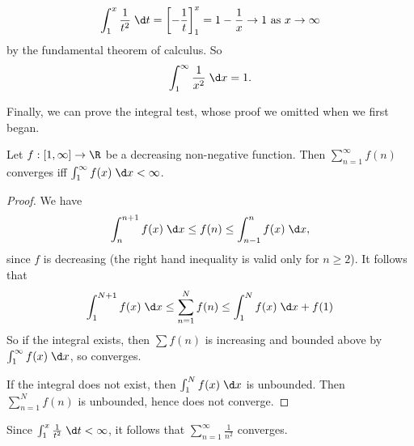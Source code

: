 \documentclass[a4paper]{article}
\begin{document}
\begin{eg}
  \[
    \int_1^x \frac{1}{t^2}\;\d t = \left[-\frac{1}{t}\right]_1^x = 1 - \frac{1}{x} \to 1\text{ as }x\to \infty
  \]
  by the fundamental theorem of calculus. So
  \[
    \int_1^{\infty}\frac{1}{x^2}\;\d x = 1.
  \]
\end{eg}

Finally, we can prove the integral test, whose proof we omitted when we first began.
\begin{thm}
  Let $f: [1, \infty] \to \R$ be a decreasing non-negative function. Then $\sum_{n = 1}^\infty f(n)$ converges iff $\int_1^\infty f(x)\;\d x < \infty$.
\end{thm}

\begin{proof}
  We have
  \[
    \int_n^{n + 1}f(x)\;\d x \leq f(n) \leq \int_{n -1}^n f(x)\;\d x,
  \]
  since $f$ is decreasing (the right hand inequality is valid only for $n\geq 2$). It follows that
  \[
    \int_1^{N + 1}f(x)\;\d x \leq \sum_{n = 1}^N f(n) \leq \int_1^N f(x)\;\d x + f(1)
  \]
  So if the integral exists, then $\sum f(n)$ is increasing and bounded above by $\int_1^\infty f(x)\;\d x$, so converges.

  If the integral does not exist, then $\int_1^N f(x)\;\d x$ is unbounded. Then $\sum_{n = 1}^N f(n)$ is unbounded, hence does not converge.
\end{proof}

\begin{eg}
  Since $\int_1^x \frac{1}{t^2}\;\d t < \infty$, it follows that $\sum_{n = 1}^\infty \frac{1}{n^2}$ converges.
\end{eg}
\end{document}
